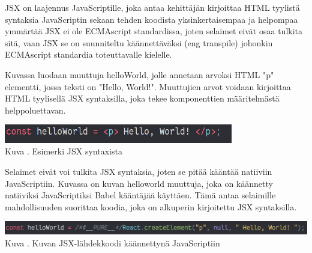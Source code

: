 






JSX on laajennus JavaScriptille, joka antaa kehittäjän kirjoittaa HTML tyylistä syntaksia JavaScriptin sekaan
tehden koodista yksinkertaisempaa ja helpompaa ymmärtää
JSX ei ole ECMAscript standardissa, joten selaimet eivät osaa tulkita sitä,
vaan JSX se on suunniteltu käännettäväksi (eng transpile) johonkin ECMAscript standardia toteuttavalle kielelle.
\medskip






Kuvassa \nextImageCount{} luodaan muuttuja helloWorld, jolle annetaan arvoksi HTML "p"{} elementti, jossa teksti on "Hello, World!"{}.
Muuttujien arvot voidaan kirjoittaa HTML tyylisellä JSX syntaksilla, 
joka tekee komponenttien määritelmästä helppoluettavan.
\medskip



\bigskip
\includegraphics[width=10cm]{src/public/oppar/pure_jsx_example.png}\\
Kuva \getImgCount {}. Esimerki JSX syntaxista
\medskip




Selaimet eivät voi tulkita JSX syntaksia, joten se pitää kääntää natiiviin JavaScriptiin.
Kuvassa \nextImageCount{} on kuvan \theimgCounter{} helloworld muuttuja, joka on käännetty natiiviksi JavaScriptiksi Babel kääntäjää käyttäen.
Tämä antaa selaimille mahdollisuuden suorittaa koodia, joka on alkuperin kirjoitettu JSX syntaksilla.
\medskip


\bigskip
\includegraphics[width=15cm]{src/public/oppar/transpiled_jsx_example.png}\\
Kuva \getImgCount {}. Kuvan \prevImageCount{} JSX-lähdekkoodi käännettynä JavaScriptiin
\medskip





